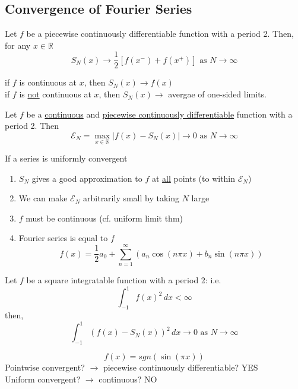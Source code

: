 \subsection{Convergence of Fourier Series}
\begin{theorem}
    Let $f$ be a piecewise continuously differentiable function with a period 2. Then, for any $x\in \mathbb{R}$
    \[S_N(x) \to \frac{1}{2}[f(x^-) + f(x^+)] \text{ as } N \to \infty\]
\end{theorem}

\begin{corollary}
    if $f$ is continuous at $x$, then $S_N(x) \to f(x)$
    \\if $f$ is \underline{not} continuous at $x$, then $S_N(x) \to$ avergae of one-sided limits.
\end{corollary}


\begin{theorem}
    Let $f$ be a \underline{continuous} and \underline{piecewise continuously differentiable} function with a period 2. Then
    \[\mathcal{E}_N = \max_{x\in \mathbb{R}}\left\lvert f(x) - S_N(x)\right\rvert \to 0 \text{ as } N \to \infty\]
\end{theorem}

If a series is uniformly convergent
\begin{enumerate}
    \item $S_N$ gives a good approximation to $f$ at \underline{all} points (to within $\mathcal{E}_N$)
    \item We can make $\mathcal{E}_N$ arbitrarily small by taking $N$ large
    \item $f$ must be continuous (cf. uniform limit thm)
    \item Fourier series is equal to $f$
    \[f(x) = \frac{1}{2}a_0 + \sum_{n=1}^{\infty}(a_n \cos (n\pi x) + b_n \sin(n\pi x))\]
\end{enumerate}

\begin{theorem}[$L^2$ Convergence]
    Let $f$ be a square integratable function with a period 2: i.e.
    \[\int_{-1}^{1}f(x)^2 \, dx < \infty\]
    then, 
    \[\int_{-1}^{1}(f(x) - S_N(x))^2\, dx \to 0 \text{ as } N\to \infty\]
\end{theorem}
\begin{example}
    \[f(x) = sgn(\sin(\pi x))\] 
    Pointwise convergent? $\rightarrow$ piecewise continuously differentiable? YES
    \\Uniform convergent? $\rightarrow$ continuous? NO
\end{example}

